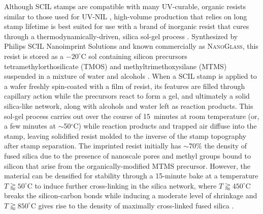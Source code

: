 \documentclass{osa-article}
\begin{document}
Although SCIL stamps are compatible with many UV-curable, organic resists similar to those used for UV-NIL \cite{Ji10,Schift10}, high-volume production that relies on long stamp lifetime is best suited for use with a brand of inorganic resist that cures through a thermodynamically-driven, silica sol-gel process \cite{Verschuuren17}.
Synthesized by Philips SCIL Nanoimprint Solutions and known commercially as \textsc{NanoGlass}, this resist is stored as a $-20^{\circ}$C sol containing silicon precursors tetramethylorthosilicate (TMOS) and methyltrimethoxysilane (MTMS) suspended in a mixture of water and alcohols \cite{Verschuuren19}. 
When a SCIL stamp is applied to a wafer freshly spin-coated with a film of resist, its features are filled through capillary action while the precursors react to form a gel, and ultimately a solid silica-like network, along with alcohols and water left as reaction products. 
This sol-gel process carries out over the course of 15~minutes at room temperature (or, a few minutes at $\sim$50$^{\circ}$C) while reaction products and trapped air diffuse into the stamp, leaving solidified resist molded to the inverse of the stamp topography after stamp separation. 
The imprinted resist initially has $\sim$70\% the density of fused silica due to the presence of nanoscale pores and methyl groups bound to silicon that arise from the organically-modified MTMS precursor. 
However, the material can be densified for stability through a 15-minute bake at a temperature $T \gtrapprox 50^{\circ}$C to induce further cross-linking in the silica network, where $T \gtrapprox 450^{\circ}$C breaks the silicon-carbon bonds while inducing a moderate level of shrinkage and $T \gtrapprox 850^{\circ}$C gives rise to the density of maximally cross-linked fused silica \cite{Verschuuren19}. 
\end{document}
